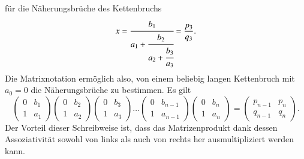 für die Näherungsbrüche des Kettenbruchs
\[
x
=
\cfrac{b_1}{
a_1+\cfrac{b_2}{
a_2+\cfrac{b_3}{a_3}}}
=
\frac{p_3}{q_3}.
\]
Die Matrixnotation ermöglich also, von einem beliebig langen Kettenbruch
mit $a_0=0$ die Näherungsbrüche zu bestimmen.
Es gilt
\begin{equation}
\begin{pmatrix}
0&b_1\\
1&a_1
\end{pmatrix}
\begin{pmatrix}
0&b_2\\
1&a_2
\end{pmatrix}
\begin{pmatrix}
0&b_3\\
1&a_3
\end{pmatrix}
\dots
\begin{pmatrix}
0&b_{n-1}\\
1&a_{n-1}
\end{pmatrix}
\begin{pmatrix}
0&b_{n}\\
1&a_{n}
\end{pmatrix}
=
\begin{pmatrix}
p_{n-1}&p_n\\
q_{n-1}&q_n
\end{pmatrix}.
\label{eqn:cf:matrixentwicklung}
\end{equation}
Der Vorteil dieser Schreibweise ist, dass das Matrizenprodukt
dank dessen Assoziativität sowohl von
links als auch von rechts her ausmultipliziert werden kann.

